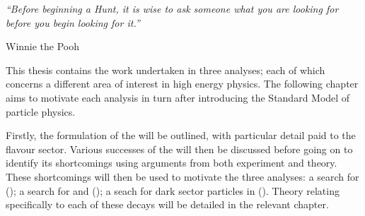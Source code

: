 
\begin{minipage}{\textwidth}
  {\it ``Before beginning a Hunt, it is wise to ask someone what you are looking for before you
  begin looking for it.''}

  {\hfill Winnie the Pooh}
\end{minipage}

\vspace{2em}

This thesis contains the work undertaken in three analyses; each of which concerns a different area
of interest in high energy physics.
The following chapter aims to motivate each analysis in turn after introducing the Standard Model
of particle physics.

Firstly, the formulation of the \sm will be outlined, with particular detail paid to the flavour
sector.
Various successes of the \sm will then be discussed before going on to identify its shortcomings
using arguments from both experiment and theory.
These shortcomings will then be used to motivate the three analyses:
a search for \btodsphi ();
a search for \btokpipimumu and \btophikmumu ();
a seach for dark sector particles in \btokstmumu ().
Theory relating specifically to each of these decays will be detailed in the relevant chapter.


